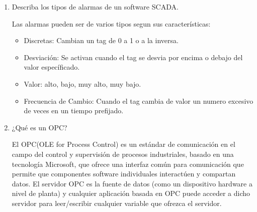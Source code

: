 \documentclass[10pt,a4paper,spanish]{article}
\begin{document}
\begin{enumerate}
    \item Describa los tipos de alarmas de un software SCADA.

    \noindent
    Las alarmas pueden ser de varios tipos segun sus características:
    \begin{itemize}
      \item Discretas: Cambian un tag de 0 a 1 o a la inversa.
      \item Desviación: Se activan cuando el tag se desvia por encima o debajo del valor específicado.
      \item Valor: alto, bajo, muy alto, muy bajo.
      \item Frecuencia de Cambio: Cuando el tag cambia de valor un numero excesivo de veces en un tiempo prefijado.
    \end{itemize}

    \item ¿Qué es un OPC?

    \noindent
    El OPC(OLE for Process Control) es un estándar de comunicación en el campo del control y supervisión de procesos industriales, basado en una tecnología Microsoft, que ofrece una interfaz común para comunicación que permite que componentes software individuales interactúen y compartan datos. El servidor OPC es la fuente de datos (como un dispositivo hardware a nivel de planta) y cualquier aplicación basada en OPC puede acceder a dicho servidor para leer/escribir cualquier variable que ofrezca el servidor.
  \end{enumerate}
\end{document}
